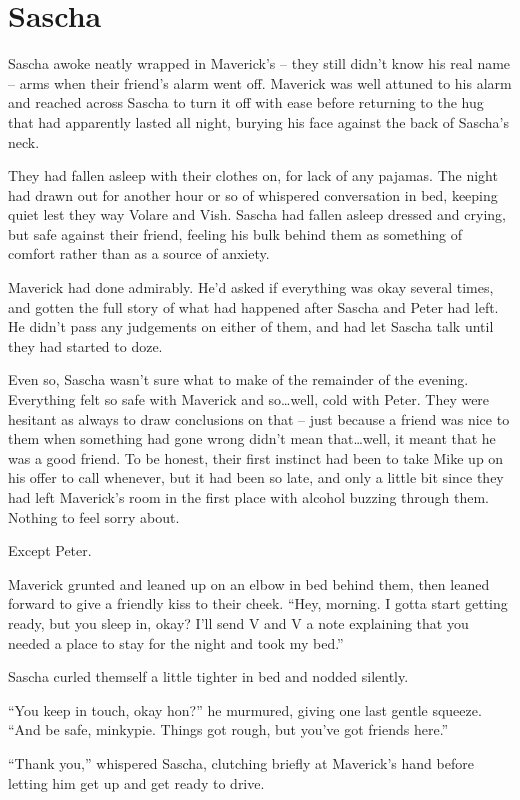 \chapter{Sascha}

Sascha awoke neatly wrapped in Maverick's -- they still didn't know his real name -- arms when their friend's alarm went off. Maverick was well attuned to his alarm and reached across Sascha to turn it off with ease before returning to the hug that had apparently lasted all night, burying his face against the back of Sascha's neck.

They had fallen asleep with their clothes on, for lack of any pajamas. The night had drawn out for another hour or so of whispered conversation in bed, keeping quiet lest they way Volare and Vish. Sascha had fallen asleep dressed and crying, but safe against their friend, feeling his bulk behind them as something of comfort rather than as a source of anxiety.

Maverick had done admirably. He'd asked if everything was okay several times, and gotten the full story of what had happened after Sascha and Peter had left. He didn't pass any judgements on either of them, and had let Sascha talk until they had started to doze.

Even so, Sascha wasn't sure what to make of the remainder of the evening. Everything felt so safe with Maverick and so\ldots{}well, cold with Peter. They were hesitant as always to draw conclusions on that -- just because a friend was nice to them when something had gone wrong didn't mean that\ldots{}well, it meant that he was a good friend. To be honest, their first instinct had been to take Mike up on his offer to call whenever, but it had been so late, and only a little bit since they had left Maverick's room in the first place with alcohol buzzing through them. Nothing to feel sorry about.

Except Peter.

Maverick grunted and leaned up on an elbow in bed behind them, then leaned forward to give a friendly kiss to their cheek. ``Hey, morning. I gotta start getting ready, but you sleep in, okay? I'll send V and V a note explaining that you needed a place to stay for the night and took my bed.''

Sascha curled themself a little tighter in bed and nodded silently.

``You keep in touch, okay hon?'' he murmured, giving one last gentle squeeze. ``And be safe, minkypie. Things got rough, but you've got friends here.''

``Thank you,'' whispered Sascha, clutching briefly at Maverick's hand before letting him get up and get ready to drive.
